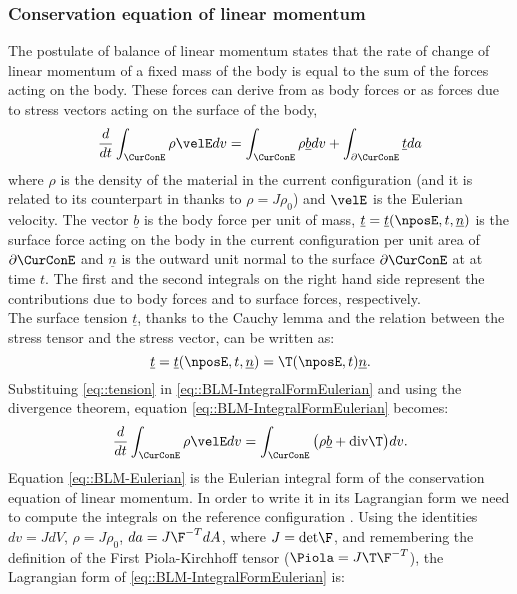 \subsubsection{Conservation equation of linear momentum}
\label{sct-Conservation}
The postulate of balance of linear momentum states that the rate of change of linear momentum of a fixed mass of the body is equal to the sum of the forces acting on the body. These forces can derive from as body forces or as forces due to stress vectors acting on the surface of the body,
\begin{equation}
  \frac{d}{dt}\int_{\CurConE}\rho\velE  dv = \int_{\CurConE}\rho\underline{b} dv+\int_{\partial\CurConE}\underline{t}da 
  \label{eq::BLM-IntegralFormEulerian}
\end{equation}
where $\rho$ is the density of the material in the current configuration (and it is related to its counterpart in \RefCon thanks to $\rho=J\rho_0$) and $\velE$ is the Eulerian velocity. The vector $\underline{b}$ is the body force per unit of mass, $\underline{t}=\underline{t}(\nposE,t, \underline{n})$ is the surface force acting on the body in the current configuration per unit area of $\partial\CurConE$ and $\underline{n}$ is the outward unit normal to the surface $\partial\CurConE$ at \npos at time $t$. The first and the second integrals on the right hand side represent the contributions due to body forces and to surface forces, respectively.\\
The surface tension $\underline{t}$, thanks to the Cauchy lemma and the relation between the stress tensor and the stress vector, can be written as:
\begin{equation}
  \underline{t}=\underline{t}(\nposE,t, \underline{n})=\T(\nposE,t)\underline{n}.
  \label{eq::tension}
\end{equation}
Substituing \eqref{eq::tension} in \eqref{eq::BLM-IntegralFormEulerian} and using the divergence theorem, equation \eqref{eq::BLM-IntegralFormEulerian} becomes:
\begin{equation}
  \frac{d}{dt}\int_{\CurConE}\rho\velE  dv = \int_{\CurConE}\big(\rho\underline{b} +\text{div}\T \big)dv.
  \label{eq::BLM-Eulerian}
\end{equation}
Equation \eqref{eq::BLM-Eulerian} is the Eulerian integral form of the conservation equation of linear momentum. In order to write it in its Lagrangian form we need to compute the integrals on the reference configuration \RefCon. Using the identities $dv=JdV$, $\rho=J\rho_0$, $da=J\F^{-T}dA$, where $J=\text{det}\F$, and remembering the definition of the First Piola-Kirchhoff tensor ($\Piola=J\T\F^{-T}$), the Lagrangian form of \eqref{eq::BLM-IntegralFormEulerian} is:

